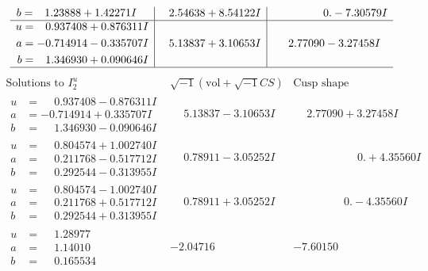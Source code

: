 \documentclass[1p]{elsarticle_modified}
\theoremstyle{definition}
\newcommand{\I}{\sqrt{-1}}
\begin{document}
$$\begin{array}{c|c|c}
\begin{aligned}
b &= \phantom{-}1.23888 + 1.42271 I\end{aligned}
 & \phantom{-}2.54638 + 8.54122 I & \phantom{-0.000000 } 0. - 7.30579 I \\ \hline\begin{aligned}
u &= \phantom{-}0.937408 + 0.876311 I \\
a &= -0.714914 - 0.335707 I \\
b &= \phantom{-}1.346930 + 0.090646 I\end{aligned}
 & \phantom{-}5.13837 + 3.10653 I & \phantom{-}2.77090 - 3.27458 I\\
 \hline 
 \end{array}$$\newpage$$\begin{array}{c|c|c}  
\text{Solutions to }I^u_{2}& \I (\text{vol} + \sqrt{-1}CS) & \text{Cusp shape}\\
 \hline 
\begin{aligned}
u &= \phantom{-}0.937408 - 0.876311 I \\
a &= -0.714914 + 0.335707 I \\
b &= \phantom{-}1.346930 - 0.090646 I\end{aligned}
 & \phantom{-}5.13837 - 3.10653 I & \phantom{-}2.77090 + 3.27458 I \\ \hline\begin{aligned}
u &= \phantom{-}0.804574 + 1.002740 I \\
a &= \phantom{-}0.211768 - 0.517712 I \\
b &= \phantom{-}0.292544 - 0.313955 I\end{aligned}
 & \phantom{-}0.78911 - 3.05252 I & \phantom{-0.000000 -}0. + 4.35560 I \\ \hline\begin{aligned}
u &= \phantom{-}0.804574 - 1.002740 I \\
a &= \phantom{-}0.211768 + 0.517712 I \\
b &= \phantom{-}0.292544 + 0.313955 I\end{aligned}
 & \phantom{-}0.78911 + 3.05252 I & \phantom{-0.000000 } 0. - 4.35560 I \\ \hline\begin{aligned}
u &= \phantom{-}1.28977\phantom{ +0.000000I} \\
a &= \phantom{-}1.14010\phantom{ +0.000000I} \\
b &= \phantom{-}0.165534\phantom{ +0.000000I}\end{aligned}
 & -2.04716\phantom{ +0.000000I} & -7.60150\phantom{ +0.000000I} \\ \hline\begin{aligned}

\end{aligned}
\end{array}$$
\end{document}
